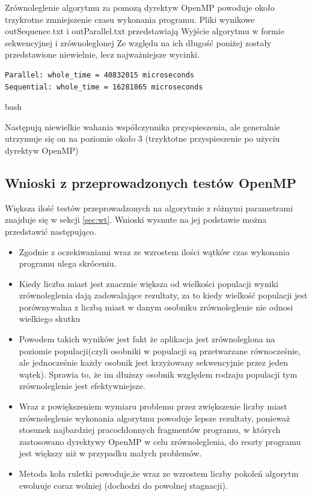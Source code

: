 \documentclass[10pt,a4paper]{article}
\begin{document}
Zrównoleglenie algorytmu za pomozą dyrektyw OpenMP powoduje około trzykrotne zmniejszenie czasu wykonania programu. Pliki wynikowe outSequence.txt i outParallel.txt przedstawiają Wyjście algorytmu w formie sekwencyjnej i zrównoleglonej Ze względu na ich długość poniżej zostały przedstawione niewielnie, lecz najważniejsze wycinki.

\begin{verbatim}
Parallel: whole_time = 40832015 microseconds
Sequential: whole_time = 16281865 microseconds
\end{verbatim}{bash}

Następują niewielkie wahania współczynnika przyspieszenia, ale generalnie utrzymuje się on na poziomie około 3 (trzyktotne przyspieszenie po użyciu dyrektyw OpenMP)
\subsection{Wnioski z przeprowadzonych testów OpenMP}
Większa ilość testów przeprowadzonych na algorytmie z różnymi parametrami znajduje się w sekcji \ref{sec:wt}. Wnioski wysnute na jej podstawie można przedstawić następująco. 
\begin{itemize}
\item Zgodnie z oczekiwaniami wraz ze wzrostem ilości wątków czas wykonania programu ulega skróceniu.
\item Kiedy liczba miast jest znacznie większa od wielkości populacji wyniki zrównoleglenia dają zadowalające rezultaty, za to kiedy wielkość populacji jest porównywalna z liczbą miast w danym osobniku zrównoleglenie nie odnosi wielkiego skutku
\item Powodem takich wyników jest fakt że aplikacja jest zrównoleglona na poziomie populacji(czyli osobniki w populacji są przetwarzane równocześnie, ale jednocześnie każdy osobnik jest krzyżowany sekwencyjnie przez jeden wątek). Sprawia to, że im dłuższy osobnik względem rodzaju populacji tym zrównoleglenie jest efektywniejsze. 
\item Wraz z powiększeniem wymiaru problemu przez zwiększenie liczby miast zrównoleglenie wykonania algorytmu powoduje lepsze rezultaty, ponieważ stosunek najbardziej pracochłonnych fragmentów programu, w których zastosowano dyrektywy OpenMP w celu zrównoleglenia, do reszty programu jest większy niż w przypadku małych problemów. 
\item Metoda koła ruletki powoduje,że wraz ze wzrostem liczby pokoleń algorytm ewoluuje coraz wolniej (dochodzi do powolnej stagnacji).
\end{itemize}
\end{document}
